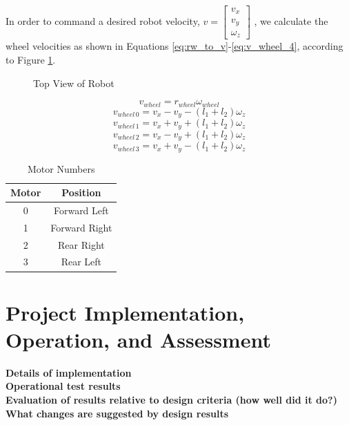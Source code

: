 \documentclass[letterpaper,12pt]{article}
\newcommand{\xxx}[1]{{\color{red}\bf #1}}
\begin{document}
In order to command a desired robot velocity,
\begin{math}
  v=
  \begin{bmatrix}
    v_x \\
    v_y \\
    \omega_z
  \end{bmatrix}
\end{math}
, we calculate the wheel velocities as shown in Equations \ref{eq:rw_to_v}-\ref{eq:v_wheel_4}, according to Figure \ref{fig:robot_top_view}.

\begin{figure}[h!]
  \centering
  
  \caption{Top View of Robot}
  \label{fig:robot_top_view}
\end{figure}

\begin{equation}
  v_{wheel}=r_{wheel}\omega_{wheel}
  \label{eq:rw_to_v}
\end{equation}
\begin{equation}
  v_{wheel\,0}=v_x-v_y-(l_1+l_2)\omega_z
  \label{eq:v_wheel_1}
\end{equation}
\begin{equation}
  v_{wheel\,1}=v_x+v_y+(l_1+l_2)\omega_z
  \label{eq:v_wheel_2}
\end{equation}
\begin{equation}
  v_{wheel\,2}=v_x-v_y+(l_1+l_2)\omega_z
  \label{eq:v_wheel_3}
\end{equation}
\begin{equation}
  v_{wheel\,3}=v_x+v_y-(l_1+l_2)\omega_z
  \label{eq:v_wheel_4}
\end{equation}

\begin{table}[h!]
  \centering
  \begin{tabular}{| c | c |}
    \hline
    \textbf{Motor} & \textbf{Position} \\
    \hline
    0 & Forward Left \\
    \hline
    1 & Forward Right \\
    \hline
    2 & Rear Right \\
    \hline
    3 & Rear Left \\
    \hline
  \end{tabular}
  \caption{Motor Numbers}
  \label{tab:motor_nums}
\end{table}

\section{Project Implementation, Operation, and Assessment}
\label{sec:implopassess}
\xxx{Details of implementation} \\
\xxx{Operational test results} \\
\xxx{Evaluation of results relative to design criteria (how well did it do?)} \\
\xxx{What changes are suggested by design results}
\end{document}
